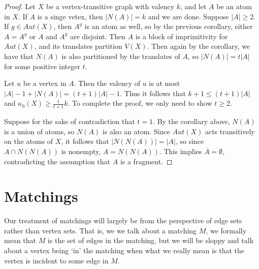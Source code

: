 \begin{proof}
	Let $X$ be a vertex-transitive graph with valency $k$, and let $A$ be an atom in $X$.  If $A$ is a singe vetex, then $|N(A)|=k$ and we are done.  Suppose $|A|\geq 2$.  If $g\in Aut(X)$, then $A^g$ is an atom as well, so by the previous corollary, either $A=A^g$ or $A$ and $A^g$ are disjoint.  Then $A$ is a block of imprimitivity for $Aut(X)$, and its translates partition $V(X)$.  Then again by the corollary, we have that $N(A)$ is also partitioned by the translates of $A$, so $|N(A)|=t|A|$ for some positive integer $t$.
	
	Let $u$ be a vertex in $A$.  Then the valency of $u$ is at most $|A|-1 + |N(A)|=(t+1)|A|-1$.  Thus it follows that $k+1\leq (t+1)|A|$ and $\kappa_0(X)\geq\frac{t}{t+1}k$.  To complete the proof, we only need to show $t\geq 2$.  
	
	Suppose for the sake of contradiction that $t=1$.  By the corollary above, $N(A)$ is a union of atoms, so $N(A)$ is also an atom.  Since $Aut(X)$ acts transitively on the atoms of $X$, it follows that $|N(N(A))|=|A|$, so since $A\cap N(N(A))$ is nonempty, $A=N(N(A))$.  This implies $\overline{A}=\emptyset$, contradicting the assumption that $A$ is a fragment.
\end{proof}






\section*{Matchings}


Our treatment of matchings will largely be from the perspective of edge sets rather than vertex sets.  That is, we we talk about a matching $M$, we formally mean that $M$ is the set of edges in the matching, but we will be sloppy and talk about a vertex being `in' the matching when what we really mean is that the vertex is incident to some edge in $M$.

